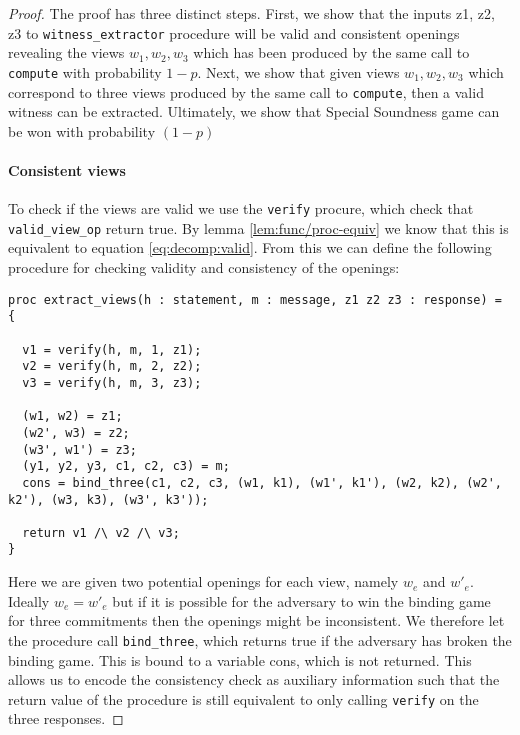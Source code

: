 \begin{proof}
  The proof has three distinct steps.
  First, we show that the inputs z1, z2, z3 to \texttt{witness\_extractor}
  procedure will be valid and consistent openings revealing the views
  $w_{1}, w_{2}, w_{3}$ which has been produced by the same call to \texttt{compute}
  with probability $1-p$. Next, we show that given views $w_{1}, w_{2}, w_{3}$
  which correspond to three views produced by the same call to \texttt{compute},
  then a valid witness can be extracted.
  Ultimately, we show that Special Soundness game can be won with probability $(1-p)$

  \paragraph{Consistent views}
  To check if the views are valid we use the \texttt{verify} procure, which
  check that \texttt{valid\_view\_op} return true. By lemma
  \ref{lem:func/proc-equiv} we know that this is equivalent to equation
  \ref{eq:decomp:valid}. From this we can define the following procedure for
  checking validity and consistency of the openings:

\begin{lstlisting}[label=lst:zkboo:consistency,caption=Consistency procedure]
proc extract_views(h : statement, m : message, z1 z2 z3 : response) = {

  v1 = verify(h, m, 1, z1);
  v2 = verify(h, m, 2, z2);
  v3 = verify(h, m, 3, z3);

  (w1, w2) = z1;
  (w2', w3) = z2;
  (w3', w1') = z3;
  (y1, y2, y3, c1, c2, c3) = m;
  cons = bind_three(c1, c2, c3, (w1, k1), (w1', k1'), (w2, k2), (w2', k2'), (w3, k3), (w3', k3'));

  return v1 /\ v2 /\ v3;
}
\end{lstlisting}

  Here we are given two potential openings for each view, namely $w_{e}$
  and $w'_{e}$. Ideally $w_{e} = w'_{e}$ but if it is possible for the adversary
  to win the binding game for three commitments then the openings might be
  inconsistent. We therefore let the procedure call \texttt{bind\_three}, which
  returns true if the adversary has broken the binding game. This is bound to a
  variable cons, which is not returned. This allows us to encode the consistency
  check as auxiliary information such that the return value of the procedure is
  still equivalent to only calling \texttt{verify} on the three responses.



\end{proof}
